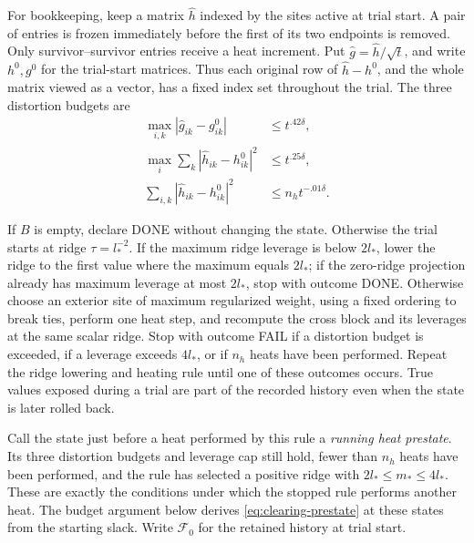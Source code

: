 For bookkeeping, keep a matrix $\hat h$ indexed by the sites active at trial
start.  A pair of entries is frozen immediately before the first of its two
endpoints is removed.  Only survivor--survivor entries receive a heat increment.
Put $\hat g=\hat h/\sqrt t$, and write $h^0,g^0$ for the trial-start matrices.
Thus each original row of $\hat h-h^0$, and the whole matrix viewed as a vector,
has a fixed index set throughout the trial.  The three distortion budgets are
\begin{equation}\label{eq:clearing-budgets}
\begin{split}
 \max_{i,k}|\hat g_{ik}-g^0_{ik}|&\le t^{.42\delta},\\
 \max_i\sum_k|\hat h_{ik}-h^0_{ik}|^2&\le t^{.25\delta},\\
 \sum_{i,k}|\hat h_{ik}-h^0_{ik}|^2&\le n_h t^{-.01\delta}.
\end{split}
\end{equation}

If $B$ is empty, declare DONE without changing the state. Otherwise the
trial starts at ridge $\tau=l_*^{-2}$. If the maximum ridge leverage is
below $2l_*$, lower the ridge to the first value where the maximum equals
$2l_*$; if the zero-ridge projection already has maximum leverage at most
$2l_*$, stop with outcome DONE. Otherwise choose an exterior site of maximum
regularized weight,
using a fixed ordering to break ties, perform one heat step, and recompute
the cross block and its leverages at the same scalar ridge.  Stop with outcome
FAIL if a distortion budget is exceeded, if a leverage exceeds $4l_*$, or if
$n_h$ heats have been performed.  Repeat the ridge lowering and heating rule
until one of these outcomes occurs. True values exposed during a trial
are part of the recorded history even when the state is later rolled back.

Call the state just before a heat performed by this rule a \emph{running
heat prestate}. Its three distortion budgets and leverage cap still hold,
fewer than $n_h$ heats have been performed, and the rule has selected a
positive ridge with $2l_*\le m_*\le4l_*$. These are exactly the conditions
under which the stopped rule performs another heat. The budget argument
below derives \eqref{eq:clearing-prestate} at these states from the starting
slack.
Write $\mathcal F_0$ for the retained history at trial start.

